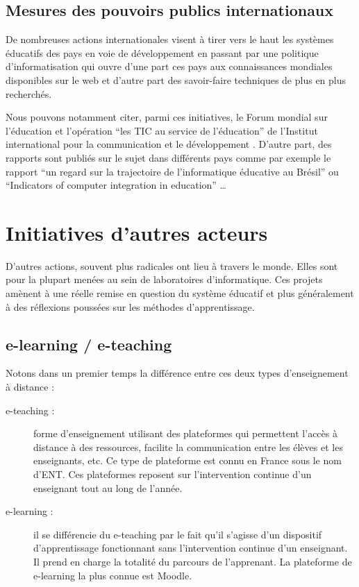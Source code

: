 \section{Mesures des pouvoirs publics internationaux}
De nombreuses actions internationales visent à tirer vers le haut les systèmes éducatifs des pays en voie de développement en passant par une politique d'informatisation qui ouvre
d'une part ces pays aux connaissances mondiales disponibles sur le web
et d'autre part des savoir-faire techniques de plus en plus
recherchés. 

Nous pouvons notamment citer, parmi ces initiatives, le Forum mondial sur l’éducation \cite{educ_forum} et l'opération “les TIC au service de l’éducation” de l’Institut international pour la communication et le développement \cite{tics}. D'autre part, des rapports sont publiés sur le sujet dans différents pays comme par exemple le rapport “un regard sur la trajectoire de
l’informatique éducative au Brésil” \cite{peixoto2006regard} ou
“Indicators of computer integration in education”\cite{pelgrum1993indicators} \ldots


\chapter{Initiatives d'autres acteurs}
\label{chap:initialivesautres}

D'autres actions, souvent plus radicales ont lieu à travers le monde. Elles sont pour la plupart menées au sein de laboratoires d'informatique. Ces projets amènent à une réelle remise en question du système éducatif et plus généralement à des réflexions poussées sur les méthodes d'apprentissage.

\section{e-learning / e-teaching}

Notons dans un premier temps la différence entre ces deux types d'enseignement à distance :

\begin{description}
  \item[e-teaching :] forme d'enseignement utilisant des plateformes qui permettent l'accès à distance à des ressources, facilite la communication entre les élèves et les enseignants, etc. Ce type de plateforme est connu en France sous le nom d'\gls{ENT}. Ces plateformes reposent sur l’intervention continue d'un enseignant tout au long de l'année.
  \item[e-learning :] il se différencie du e-teaching par le fait qu'il s'agisse d'un dispositif d'apprentissage fonctionnant sans l'intervention continue d'un enseignant. Il prend en charge la totalité du parcours de l'apprenant. La plateforme de e-learning la plus connue est Moodle\cite{moodle_website}.
\end{description}

